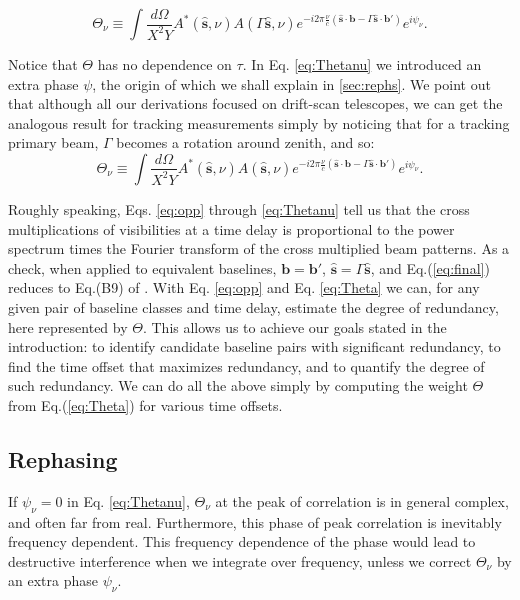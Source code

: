 \documentclass[twocolumn,apj,numberedappendix]{emulateapj}
\renewcommand\[{\begin{equation}}
\renewcommand\]{\end{equation}}
\begin{document}
\[
\Theta_{\nu} \equiv \int \frac{d\Omega}{X^{2}Y}A^{*}(\hat{\boldsymbol{s}},\nu)A(\Gamma\hat{\boldsymbol{s}},\nu) e^{-i2\pi\frac{\nu}{c}\left(\hat{\boldsymbol{s}}\cdot\boldsymbol{b}-\Gamma\hat{\boldsymbol{s}}\cdot\boldsymbol{b'}\right)}e^{i\psi_{\nu}}.
\label{eq:Thetanu}
\]


Notice that $\Theta$ has no dependence on $\tau$. In Eq. \eqref{eq:Thetanu} we introduced an extra phase $\psi$, the origin of which we shall explain in \ref{sec:rephs}. We point out that although all our derivations focused on drift-scan telescopes, we can get the analogous result for tracking measurements simply by noticing that for a tracking primary beam, $\Gamma$ becomes a rotation around zenith, and so:
\[
\Theta_{\nu} \equiv \int \frac{d\Omega}{X^{2}Y}A^{*}(\hat{\boldsymbol{s}},\nu)A(\hat{\boldsymbol{s}},\nu) e^{-i2\pi\frac{\nu}{c}\left(\hat{\boldsymbol{s}}\cdot\boldsymbol{b}-\Gamma\hat{\boldsymbol{s}}\cdot\boldsymbol{b'}\right)}e^{i\psi_{\nu}}.
\label{eq:Thetanu_tracking}
\]

Roughly speaking, Eqs. \eqref{eq:opp} through \eqref{eq:Thetanu} tell us that the cross multiplications of visibilities at a time delay is proportional to the power spectrum times the Fourier
transform of the cross multiplied beam patterns. As a check, when applied to equivalent baselines,
$\boldsymbol{b}=\boldsymbol{b'}$, $\hat{\boldsymbol{s}}=\Gamma\hat{\boldsymbol{s}}$, and Eq.(\ref{eq:final}) reduces to Eq.(B9) of \cite{paper32}. 
With Eq. \eqref{eq:opp} and Eq. \eqref{eq:Theta} we can, for any given pair of baseline classes and time delay, estimate the degree of redundancy, here represented by $\Theta$. This allows us to achieve our goals stated in the introduction: to identify 
candidate baseline pairs with significant redundancy, to find the time offset that maximizes redundancy, and to quantify the degree of such redundancy. We can do all the above simply by computing the weight $\Theta$ from
Eq.(\ref{eq:Theta}) for various time offsets. 



\subsection{Rephasing \label{sec:rephs}}
If $\psi_{\nu}=0$ in  Eq. \eqref{eq:Thetanu}, $\Theta_{\nu}$ at the peak of correlation is in general complex, and often far from real. Furthermore, this phase of peak correlation is inevitably frequency dependent. This frequency dependence of the phase would lead to destructive interference when we integrate over frequency, unless we correct $\Theta_{\nu}$ by an extra phase $\psi_\nu$. 
\end{document}

